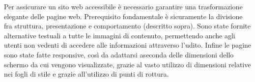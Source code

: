 Per assicurare un sito web accessibile è necessario garantire una trasformazione elegante delle pagine web.
Prerequisito fondamentale è sicuramente la divisione fra struttura, presentazione e comportamento (descritto sopra).
Sono state fornite alternative testuali a tutte le immagini di contenuto, permettendo anche agli utenti non vedenti
di accedere alle informazioni attraverso l’udito.
Infine le pagine sono state fatte responsive, così da adattarsi aseconda delle dimensioni dello schermo da cui vengono
visualizzate, grazie al vasto utilizzo di dimensioni relative nei fogli di stile e grazie all’utilizzo di punti di rottura.